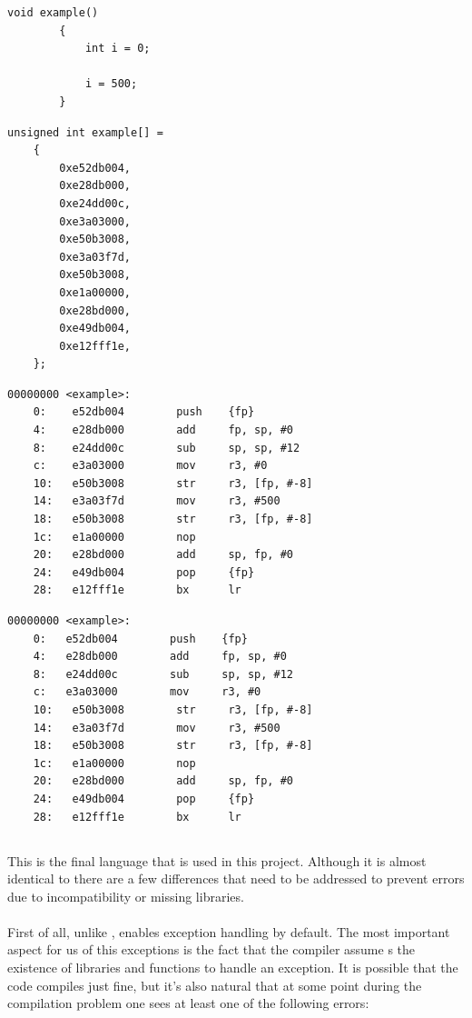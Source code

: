 \documentclass[12pt, svgnames]{book}
\begin{document}
\begin{minipage}{0.5\textwidth}
	\lstset{framesep=53pt}
	\begin{lstlisting}[style=c-small, title= Function]
		void example()
		{
			int i = 0;
		
			i = 500;
		}
	\end{lstlisting}
\end{minipage}
\begin{minipage}{0.5\textwidth}
	\begin{lstlisting}[style=c-small, title= Array]
	unsigned int example[] =
	{
		0xe52db004,
		0xe28db000,
		0xe24dd00c,
		0xe3a03000,
		0xe50b3008,
		0xe3a03f7d,
		0xe50b3008,
		0xe1a00000,                     
		0xe28bd000,
		0xe49db004,   
		0xe12fff1e,
	};
	\end{lstlisting}
\end{minipage}
\begin{minipage}{0.5\textwidth}
	\begin{lstlisting}[style=disassembly,]
	00000000 <example>:
	0:    e52db004        push    {fp}
	4:    e28db000        add     fp, sp, #0
	8:    e24dd00c        sub     sp, sp, #12
	c:    e3a03000        mov     r3, #0
	10:   e50b3008        str     r3, [fp, #-8]
	14:   e3a03f7d        mov     r3, #500 
	18:   e50b3008        str     r3, [fp, #-8]
	1c:   e1a00000        nop                     
	20:   e28bd000        add     sp, fp, #0
	24:   e49db004        pop     {fp}   
	28:   e12fff1e        bx      lr
	\end{lstlisting}
\end{minipage}
\begin{minipage}{0.5\textwidth}
	\begin{lstlisting}[style=disassembly,]
	00000000 <example>:
	0:   e52db004        push    {fp}            
	4:   e28db000        add     fp, sp, #0
	8:   e24dd00c        sub     sp, sp, #12
	c:   e3a03000        mov     r3, #0
	10:   e50b3008        str     r3, [fp, #-8]
	14:   e3a03f7d        mov     r3, #500       
	18:   e50b3008        str     r3, [fp, #-8]
	1c:   e1a00000        nop                     
	20:   e28bd000        add     sp, fp, #0
	24:   e49db004        pop     {fp}            
	28:   e12fff1e        bx      lr
	\end{lstlisting}
\end{minipage}

\subsection{}
This is the final language that is used in this project. Although it is almost identical to  there are a few differences that need to be addressed to prevent errors due to incompatibility or missing libraries.
\\~\\
First of all, unlike ,  enables exception handling by default. The most important aspect for us of this exceptions is the fact that the compiler assume s the existence of libraries and functions to handle an exception. It is possible that the code compiles just fine, but it's also natural that at some point during the compilation problem one sees at least one of the following errors:
\end{document}
